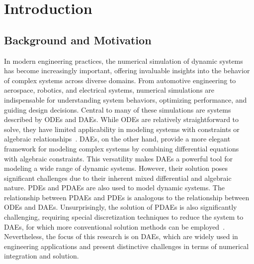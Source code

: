 
\chapter{Introduction}
\label{chap1:introduction}


\section{Background and Motivation}

In modern engineering practices, the numerical simulation of dynamic systems has become increasingly important, offering invaluable insights into the behavior of complex systems across diverse domains. From automotive engineering to aerospace, robotics, and electrical systems, numerical simulations are indispensable for understanding system behaviors, optimizing performance, and guiding design decisions. Central to many of these simulations are systems described by \acp{ODE} and \acp{DAE}. While \acp{ODE} are relatively straightforward to solve, they have limited applicability in modeling systems with constraints or algebraic relationships~\cite{brenan1995numerical}. \acp{DAE}, on the other hand, provide a more elegant framework for modeling complex systems by combining differential equations with algebraic constraints. This versatility makes \acp{DAE} a powerful tool for modeling a wide range of dynamic systems. However, their solution poses significant challenges due to their inherent mixed differential and algebraic nature. \acp{PDE} and \acp{PDAE} are also used to model dynamic systems. The relationship between \acp{PDAE} and \acp{PDE} is analogous to the relationship between \acp{ODE} and \acp{DAE}. Unsurprisingly, the solution of \acp{PDAE} is also significantly challenging, requiring special discretization techniques to reduce the system to \acp{DAE}, for which more conventional solution methods can be employed~\cite{dedieuleveult2009global}. Nevertheless, the focus of this research is on \acp{DAE}, which are widely used in engineering applications and present distinctive challenges in terms of numerical integration and solution.

